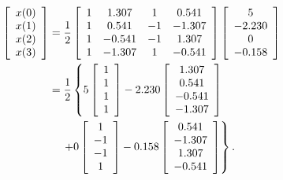 \documentclass{article}
\begin{document}
\begin{align*}
    \left[
    \begin{array}{l}
            x(0) \\ x(1) \\ x(2) \\ x(3)
    \\ \end{array}
    \right]
    &=
    \frac{1}{2}
    \left[ \begin{array}{cccc}
     1 &  1.307 & 1 & 0.541 \\
     1 &  0.541 & -1 & -1.307 \\
     1 &  -0.541 & -1 & 1.307 \\
     1 &  -1.307 & 1 & -0.541 \\ \end{array} \right]
    \left[
    \begin{array}{c}
            5 \\ -2.230 \\ 0 \\ -0.158
    \\ \end{array}
    \right]
    \\
    &=
    \frac{1}{2} \left\{
    5
    \left[
    \begin{array}{c}
            1 \\ 1 \\ 1 \\ 1
    \\ \end{array}
    \right]
    - 2.230
    \left[
    \begin{array}{c}
            1.307 \\ 0.541 \\ -0.541  \\ -1.307
    \\ \end{array}
    \right] \right.\\
    &\mathrel{\ifpdf \phantom{=} \else \fbox{\phantom{=}} \fi} \left. +0
    \left[
    \begin{array}{c}
            1 \\ -1 \\ -1 \\ 1
    \\ \end{array}
    \right]
    -0.158
    \left[
    \begin{array}{c}
            0.541 \\ -1.307 \\ 1.307 \\ -0.541
    \\ \end{array}
    \right]
    \right\}.
    \end{align*}
\end{document}
